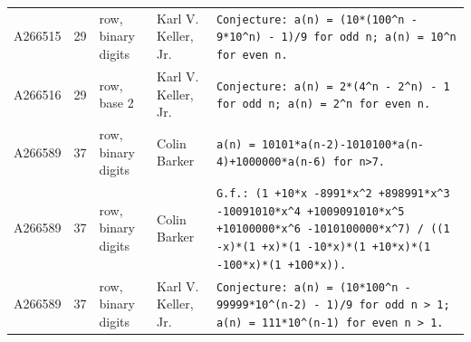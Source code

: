 \documentclass[11pt]{article}
\theoremstyle{definition}
\theoremstyle{remark}
\begin{document}
{\begin{longtable}{p{1.3cm}p{0.7cm}p{2.4cm}p{2.3cm}p{7.3cm}}
A266515 & 29 & row, binary digits & Karl V. Keller, Jr. & \texttt{Conjecture: \allowbreak{}a(n)\allowbreak{} \allowbreak{}=\allowbreak{} \allowbreak{}(10*\allowbreak{}(100\^{}n \allowbreak{}-\allowbreak{} \allowbreak{}9*\allowbreak{}10\^{}n)\allowbreak{} \allowbreak{}-\allowbreak{} \allowbreak{}1)\allowbreak{}/\allowbreak{}9 \allowbreak{}for \allowbreak{}odd \allowbreak{}n; \allowbreak{}a(n)\allowbreak{} \allowbreak{}=\allowbreak{} \allowbreak{}10\^{}n \allowbreak{}for \allowbreak{}even \allowbreak{}n.} \\
A266516 & 29 & row, base 2 & Karl V. Keller, Jr. & \texttt{Conjecture: \allowbreak{}a(n)\allowbreak{} \allowbreak{}=\allowbreak{} \allowbreak{}2*\allowbreak{}(4\^{}n \allowbreak{}-\allowbreak{} \allowbreak{}2\^{}n)\allowbreak{} \allowbreak{}-\allowbreak{} \allowbreak{}1 \allowbreak{}for \allowbreak{}odd \allowbreak{}n; \allowbreak{}a(n)\allowbreak{} \allowbreak{}=\allowbreak{} \allowbreak{}2\^{}n \allowbreak{}for \allowbreak{}even \allowbreak{}n.} \\
A266589 & 37 & row, binary digits & Colin Barker & \texttt{a(n)\allowbreak{} \allowbreak{}=\allowbreak{} \allowbreak{}10101*\allowbreak{}a(n-\allowbreak{}2)\allowbreak{}-\allowbreak{}1010100*\allowbreak{}a(n-\allowbreak{}4)\allowbreak{}+\allowbreak{}1000000*\allowbreak{}a(n-\allowbreak{}6)\allowbreak{} \allowbreak{}for \allowbreak{}n>7.} \\
A266589 & 37 & row, binary digits & Colin Barker & \texttt{G.f.: \allowbreak{}(1 \allowbreak{}+\allowbreak{}10*\allowbreak{}x \allowbreak{}-\allowbreak{}8991*\allowbreak{}x\^{}2 \allowbreak{}+\allowbreak{}898991*\allowbreak{}x\^{}3 \allowbreak{}-\allowbreak{}10091010*\allowbreak{}x\^{}4 \allowbreak{}+\allowbreak{}1009091010*\allowbreak{}x\^{}5 \allowbreak{}+\allowbreak{}10100000*\allowbreak{}x\^{}6 \allowbreak{}-\allowbreak{}1010100000*\allowbreak{}x\^{}7)\allowbreak{} \allowbreak{}/\allowbreak{} \allowbreak{}((1 \allowbreak{}-\allowbreak{}x)\allowbreak{}*\allowbreak{}(1 \allowbreak{}+\allowbreak{}x)\allowbreak{}*\allowbreak{}(1 \allowbreak{}-\allowbreak{}10*\allowbreak{}x)\allowbreak{}*\allowbreak{}(1 \allowbreak{}+\allowbreak{}10*\allowbreak{}x)\allowbreak{}*\allowbreak{}(1 \allowbreak{}-\allowbreak{}100*\allowbreak{}x)\allowbreak{}*\allowbreak{}(1 \allowbreak{}+\allowbreak{}100*\allowbreak{}x)\allowbreak{})\allowbreak{}.} \\
A266589 & 37 & row, binary digits & Karl V. Keller, Jr. & \texttt{Conjecture: \allowbreak{}a(n)\allowbreak{} \allowbreak{}=\allowbreak{} \allowbreak{}(10*\allowbreak{}100\^{}n \allowbreak{}-\allowbreak{} \allowbreak{}99999*\allowbreak{}10\^{}(n-\allowbreak{}2)\allowbreak{} \allowbreak{}-\allowbreak{} \allowbreak{}1)\allowbreak{}/\allowbreak{}9 \allowbreak{}for \allowbreak{}odd \allowbreak{}n \allowbreak{}> \allowbreak{}1; \allowbreak{}a(n)\allowbreak{} \allowbreak{}=\allowbreak{} \allowbreak{}111*\allowbreak{}10\^{}(n-\allowbreak{}1)\allowbreak{} \allowbreak{}for \allowbreak{}even \allowbreak{}n \allowbreak{}> \allowbreak{}1.} \\

\end{longtable}}
\end{document}
